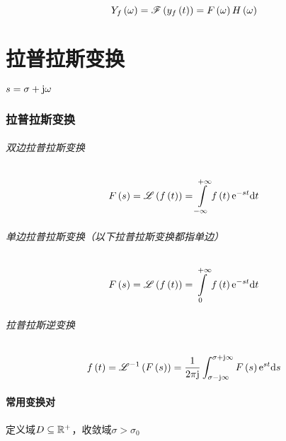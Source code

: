 \documentclass{article}
\begin{document}
\[Y_f\left(\omega\right)=\mathscr F\left(y_f\left(t\right)\right)=F\left(\omega\right) H\left(\omega\right)\]

\part{拉普拉斯变换}

$s=\sigma+\mathrm j\omega$

\section{拉普拉斯变换}

\paragraph{双边拉普拉斯变换}

\[\fs=\laplace{\ft}=\impint\ft\e^{-st}\d t\]

\paragraph{单边拉普拉斯变换（以下拉普拉斯变换都指单边）}

\[F\left(s\right)=\mathscr L\left(f\left(t\right)\right)=\int\limits_0^{+\infty}f\left(t\right)\mathrm e^{-st}\mathrm d t\]

\paragraph{拉普拉斯逆变换}

\[f\left(t\right)=\mathscr L^{-1}\left(F\left(s\right)\right)=\frac1{2\pi\mathrm j}\int_{\sigma-\mathrm j\infty}^{\sigma+\mathrm j\infty}F\left(s\right)\mathrm e^{st}\mathrm d s\]

\subsection{常用变换对}

定义域$D\subseteq\mathbb R^+$，收敛域$\sigma>\sigma_0$
\end{document}
